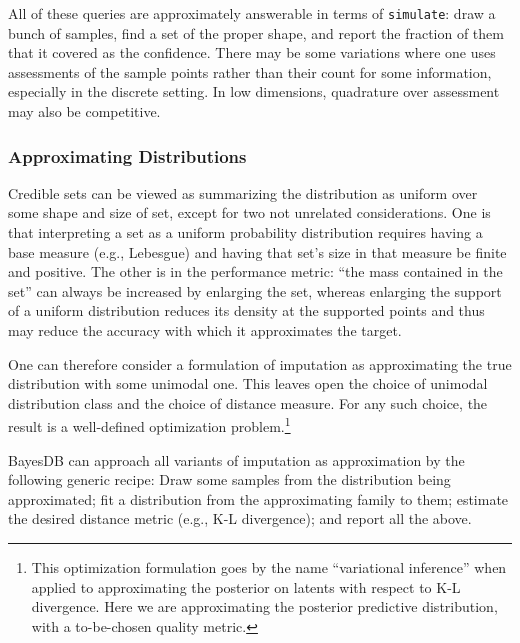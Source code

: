 \documentclass[10pt,letterpaper]{article}
\begin{document}
All of these queries are approximately answerable in terms of
\texttt{simulate}: draw a bunch of samples, find a set of the proper
shape, and report the fraction of them that it covered as the
confidence.  There may be some variations where one uses assessments
of the sample points rather than their count for some information,
especially in the discrete setting.  In low dimensions, quadrature
over assessment may also be competitive.

\subsubsection{Approximating Distributions}

Credible sets can be viewed as summarizing the distribution as uniform
over some shape and size of set, except for two not unrelated
considerations.  One is that interpreting a set as a uniform
probability distribution requires having a base measure (e.g.,
Lebesgue) and having that set's size in that measure be finite and
positive.  The other is in the performance metric: ``the mass
contained in the set'' can always be increased by enlarging the set,
whereas enlarging the support of a uniform distribution reduces its
density at the supported points and thus may reduce the accuracy with
which it approximates the target.

One can therefore consider a formulation of imputation as
approximating the true distribution with some unimodal one.  This
leaves open the choice of unimodal distribution class and the choice
of distance measure.  For any such choice, the result is a
well-defined optimization problem.\footnote{This optimization
  formulation goes by the name ``variational inference'' when applied
  to approximating the posterior on latents with respect to K-L
  divergence.  Here we are approximating the posterior predictive
  distribution, with a to-be-chosen quality metric.}

BayesDB can approach all variants of imputation as approximation by
the following generic recipe: Draw some samples from the distribution
being approximated; fit a distribution from the approximating family
to them; estimate the desired distance metric (e.g., K-L divergence);
and report all the above.
\end{document}
